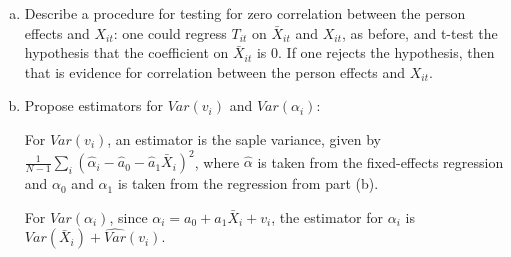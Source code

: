 \documentclass[11pt]{article}
\begin{document}
\begin{enumerate}[1)]
\begin{enumerate}[(a)]
		\item Describe a procedure for testing for zero correlation between the person effects and $X_{it}$: one could regress $T_{it}$ on $\bar{X}_{it}$ and $X_{it}$, as before, and t-test the hypothesis that the coefficient on $\bar{X}_{it}$ is 0. If one rejects the hypothesis, then that is evidence for correlation between the person effects and $X_{it}$.

		\item Propose estimators for $Var(v_i)$ and $Var(\alpha_i)$:

		For $Var(v_i)$, an estimator is the saple variance, given by $\frac{1}{N-1} \sum_i (\hat{\alpha}_i - \hat{a}_0 - \hat{a}_1 \bar{X}_i)^2$, where $\hat{\alpha}$ is taken from the fixed-effects regression and $\alpha_0$ and $\alpha_1$ is taken from the regression from part (b). 

		For $Var(\alpha_i)$, since $\alpha_i = a_0 + a_1 \bar{X}_i + v_i$, the estimator for $\alpha_i$ is $Var(\bar{X}_i) + \hat{Var}(v_i)$.
	
	\end{enumerate}
	


\end{enumerate}
\end{document}
